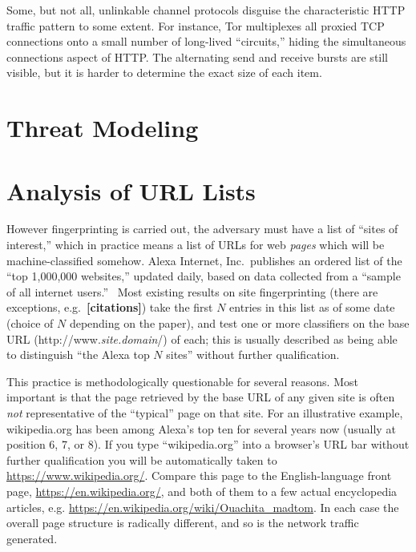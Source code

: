 \documentclass[tinymargin]{zarticle}
\def\todo#1{{\color{todocolor}\bfseries [#1]}}
\begin{document}
Some, but not all, unlinkable channel protocols disguise the
characteristic HTTP traffic pattern to some extent.  For instance, Tor
multiplexes all proxied TCP connections onto a small number of
long-lived “circuits,” hiding the simultaneous connections aspect of
HTTP.  The alternating send and receive bursts are still visible, but
it is harder to determine the exact size of each item.

\section{Threat Modeling}

\section{Analysis of URL Lists}

However fingerprinting is carried out, the adversary must have a list
of “sites of interest,” which in practice means a list of URLs for web
\emph{pages} which will be machine-classified somehow.  Alexa
Internet, Inc.\ publishes an ordered list of the “top 1,000,000
websites,” updated daily, based on data collected from a “sample of
all internet users.”~\cite{alexa.undated.topsites} Most existing
results on site fingerprinting (there are exceptions,
e.g.~\todo{citations}) take the first $N$ entries in this list as of
some date (choice of $N$ depending on the paper), and test one or more
classifiers on the base URL
(\textsf{http://www.\textit{site.domain}/}) of each; this is usually
described as being able to distinguish “the Alexa top $N$ sites”
without further qualification.

This practice is methodologically questionable for several reasons.
Most important is that the page retrieved by the base URL of any given
site is often \emph{not} representative of the “typical” page on that
site.  For an illustrative example, \textsf{wikipedia.org} has been
among Alexa's top ten for several years now (usually at position 6, 7,
or 8).  If you type “\textsf{wikipedia.org}” into a browser's URL bar
without further qualification you will be automatically taken to
\url{https://www.wikipedia.org/}.  Compare this page to the
English-language front page, \url{https://en.wikipedia.org/}, and both
of them to a few actual encyclopedia articles,
e.g. \url{https://en.wikipedia.org/wiki/Ouachita_madtom}.  In each
case the overall page structure is radically different, and so is the
network traffic generated.
\end{document}
